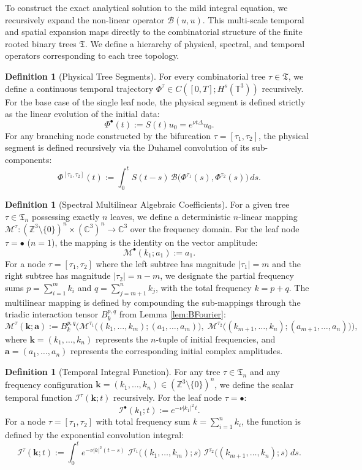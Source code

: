 \documentclass[12pt,a4paper]{article}
\theoremstyle{plain}
\theoremstyle{definition}
\newtheorem{definition}[theorem]{Definition}
\theoremstyle{remark}
\newcommand{\Hs}{H^s}
\newcommand{\T}{\mathbb{T}}
\newcommand{\Z}{\mathbb{Z}}
\newcommand{\BB}{\mathcal{B}}
\newcommand{\MM}{\mathcal{M}}
\newcommand{\II}{\mathcal{I}}
\newcommand{\fT}{\mathfrak{T}}
\begin{document}
To construct the exact analytical solution to the mild integral equation, we recursively expand the non-linear operator $\BB(u,u)$. This multi-scale temporal and spatial expansion maps directly to the combinatorial structure of the finite rooted binary trees $\fT$. We define a hierarchy of physical, spectral, and temporal operators corresponding to each tree topology.

\begin{definition}[Physical Tree Segments]
\label{def:Phi}
For every combinatorial tree $\tau \in \fT$, we define a continuous temporal trajectory $\Phi^\tau \in C([0,T];\Hs(\T^3))$ recursively. 
For the base case of the single leaf node, the physical segment is defined strictly as the linear evolution of the initial data:
\[
  \Phi^\bullet(t) := S(t)u_0 = e^{\nu t\Delta}u_0.
\]
For any branching node constructed by the bifurcation $\tau = [\tau_1,\tau_2]$, the physical segment is defined recursively via the Duhamel convolution of its sub-components:
\[
  \Phi^{[\tau_1,\tau_2]}(t)
  :=
  \int_0^t S(t-s)\,\BB\big(\Phi^{\tau_1}(s),\Phi^{\tau_2}(s)\big)\,ds.
\]
\end{definition}

\begin{definition}[Spectral Multilinear Algebraic Coefficients]
\label{def:M}
For a given tree $\tau \in \fT_n$ possessing exactly $n$ leaves, we define a deterministic $n$-linear mapping $\MM^\tau : (\Z^3\setminus\{0\})^n \times (\mathbb{C}^3)^n \to \mathbb{C}^3$ over the frequency domain. 
For the leaf node $\tau = \bullet$ ($n=1$), the mapping is the identity on the vector amplitude:
\[
  \MM^\bullet(k_1;a_1) := a_1.
\]
For a node $\tau = [\tau_1,\tau_2]$ where the left subtree has magnitude $|\tau_1|=m$ and the right subtree has magnitude $|\tau_2|=n-m$, we designate the partial frequency sums $p = \sum_{i=1}^m k_i$ and $q = \sum_{j=m+1}^n k_j$, with the total frequency $k = p+q$. The multilinear mapping is defined by compounding the sub-mappings through the triadic interaction tensor $B_k^{p,q}$ from Lemma \ref{lem:BFourier}:
\[
  \MM^\tau(\mathbf{k};\mathbf{a})
  :=
  B_k^{p,q}\!\Big(
    \MM^{\tau_1}\big((k_1,\dots,k_m);(a_1,\dots,a_m)\big),\;
    \MM^{\tau_2}\big((k_{m+1},\dots,k_n);(a_{m+1},\dots,a_n)\big)
  \Big),
\]
where $\mathbf{k}=(k_1,\dots,k_n)$ represents the $n$-tuple of initial frequencies, and $\mathbf{a}=(a_1,\dots,a_n)$ represents the corresponding initial complex amplitudes.
\end{definition}

\begin{definition}[Temporal Integral Function]
\label{def:I}
For any tree $\tau \in \fT_n$ and any frequency configuration $\mathbf{k}=(k_1,\dots,k_n) \in (\Z^3\setminus\{0\})^n$, we define the scalar temporal function $\II^\tau(\mathbf{k};t)$ recursively.
For the leaf node $\tau = \bullet$:
\[
  \II^\bullet(k_1;t) := e^{-\nu|k_1|^2\,t}.
\]
For a node $\tau = [\tau_1,\tau_2]$ with total frequency sum $k = \sum_{i=1}^n k_i$, the function is defined by the exponential convolution integral:
\[
  \II^\tau(\mathbf{k};t)
  :=
  \int_0^t e^{-\nu|k|^2(t-s)}\;
  \II^{\tau_1}\big((k_1,\dots,k_m);s\big)\;
  \II^{\tau_2}\big((k_{m+1},\dots,k_n);s\big)\;ds.
\]
\end{definition}
\end{document}
